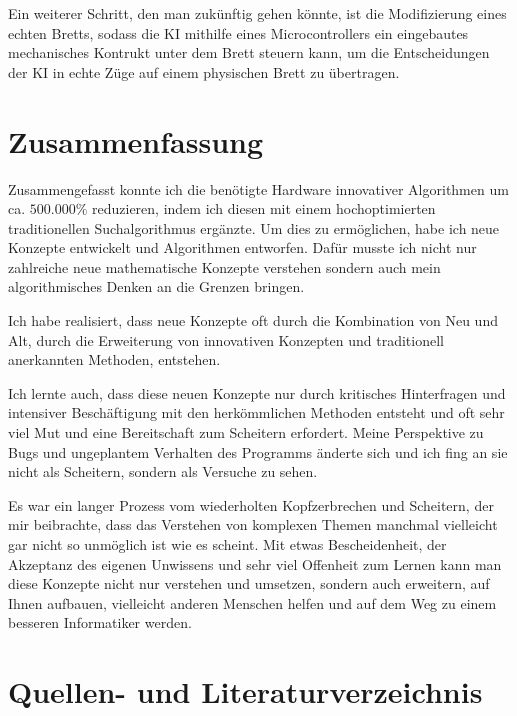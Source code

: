 \documentclass{jpp}
\begin{document}
Ein weiterer Schritt, den man zukünftig gehen könnte, ist die Modifizierung eines echten Bretts, sodass die KI mithilfe eines Microcontrollers ein eingebautes mechanisches Kontrukt unter dem Brett steuern kann, um die Entscheidungen der KI in echte Züge auf einem physischen Brett zu übertragen.

\section{Zusammenfassung}
Zusammengefasst konnte ich die benötigte Hardware innovativer Algorithmen um ca. $500.000\%$ reduzieren, indem ich diesen mit einem hochoptimierten traditionellen Suchalgorithmus ergänzte. Um dies zu ermöglichen, habe ich neue Konzepte entwickelt und Algorithmen entworfen. Dafür musste ich nicht nur zahlreiche neue mathematische Konzepte verstehen sondern auch mein algorithmisches Denken an die Grenzen bringen. 

Ich habe realisiert, dass neue Konzepte oft durch die Kombination von Neu und Alt, durch die Erweiterung von innovativen Konzepten und traditionell anerkannten Methoden, entstehen.

Ich lernte auch, dass diese neuen Konzepte nur durch kritisches Hinterfragen und intensiver Beschäftigung mit den herkömmlichen Methoden entsteht und oft sehr viel Mut und eine Bereitschaft zum Scheitern erfordert. Meine Perspektive zu Bugs und ungeplantem Verhalten des Programms änderte sich und ich fing an sie nicht als Scheitern, sondern als Versuche zu sehen.  

Es war ein langer Prozess vom wiederholten Kopfzerbrechen und Scheitern, der mir beibrachte, dass das Verstehen von komplexen Themen manchmal vielleicht gar nicht so unmöglich ist wie es scheint. Mit etwas Bescheidenheit, der Akzeptanz des eigenen Unwissens und sehr viel Offenheit zum Lernen kann man diese Konzepte nicht nur verstehen und umsetzen, sondern auch erweitern, auf Ihnen aufbauen, vielleicht anderen Menschen helfen und auf dem Weg zu einem besseren Informatiker werden.

\section{Quellen- und Literaturverzeichnis}
\end{document}
